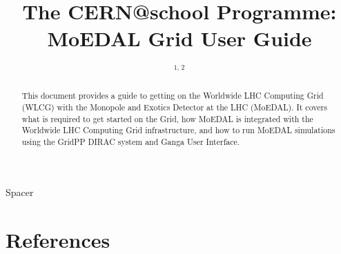 \documentclass[12pt,a4paper]{iopart}
\begin{document}
%
%


\title{%
The CERN@school Programme:\\
MoEDAL Grid User Guide%
}
% 
\author{\theauthorinit$^{1, \, 2}$}
%
\address{$^1$\theauthoraddressA}
\address{$^2$\theauthoraddressB}
\ead{\mailto{\theauthoremail}}

\begin{abstract}
This document provides a guide to getting on the Worldwide LHC Computing Grid
(WLCG) with the Monopole and Exotics Detector at the LHC (MoEDAL).
It covers what is required to get started on the Grid,
how MoEDAL is integrated with the Worldwide LHC Computing Grid infrastructure,
and how to run MoEDAL simulations using the GridPP DIRAC system and
Ganga User Interface.
\end{abstract}
%

{\color{white}Spacer}
\\[5cm]



\newpage

\setcounter{tocdepth}{2}
\tableofcontents

\newpage

%
%


\newpage



\newpage



\newpage






\newpage

%
%
\section{References}
\label{sec:references}


%
\end{document}
